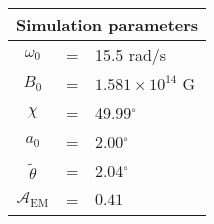 \begin{tabular}{ccl}
\multicolumn{3}{c}{Simulation parameters} \\
\hline
$\omega_0$  &=& 15.5 rad/s\\
$B_0$  &=& ${1.581}\times 10^{14}$ G \\
$\chi$  &=& 49.99$^{\circ}$ \\
$a_0$ &=& 2.00$^{\circ}$ \\
$\tilde{\theta}$ &= & 2.04$^{\circ}$ \\
$\mathcal{A}_{\mathrm{EM}}$ &= & $0.41$
\end{tabular}